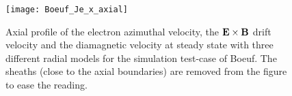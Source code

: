    
  \begin{figure}[hbt]
    \centering
    \texttt{[image: Boeuf\_Je\_x\_axial]}
    \caption{Axial profile of the electron azimuthal velocity, the ${\mathbf E} \times {\mathbf B}$ drift velocity and the diamagnetic velocity at steady state with three different radial models for the simulation test-case of Boeuf. The sheaths (close to the axial boundaries) are removed from the figure to ease the reading.}
    \label{fig-Jetheta}
  \end{figure}

